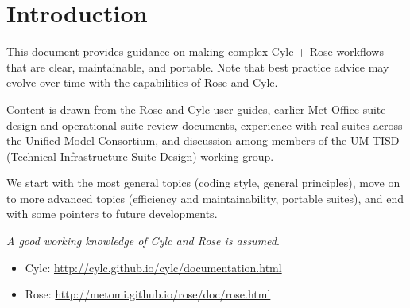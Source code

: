 \section{Introduction}
\label{Introduction}

This document provides guidance on making complex Cylc + Rose workflows that
are clear, maintainable, and portable. Note that best practice advice may
evolve over time with the capabilities of Rose and Cylc.

Content is drawn from the Rose and Cylc user guides, earlier Met Office suite
design and operational suite review documents, experience with real suites
across the Unified Model Consortium, and discussion among members of the UM
TISD (Technical Infrastructure Suite Design) working group.

We start with the most general topics (coding style, general principles),
move on to more advanced topics (efficiency and maintainability, portable
suites), and end with some pointers to future developments.

{\em A good working knowledge of Cylc and Rose is assumed}.

\begin{itemize}
    \item Cylc: \url{http://cylc.github.io/cylc/documentation.html}
    \item Rose: \url{http://metomi.github.io/rose/doc/rose.html}
\end{itemize}

